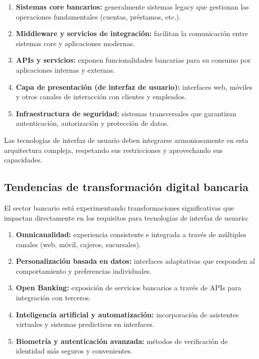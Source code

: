 \begin{enumerate}
  \item \textbf{Sistemas core bancarios:} generalmente sistemas legacy que
        gestionan las operaciones fundamentales (cuentas, préstamos, etc.).
  \item \textbf{Middleware y servicios de integración:} facilitan la
        comunicación entre sistemas core y aplicaciones modernas.
  \item \textbf{APIs y servicios:} exponen funcionalidades bancarias para su
        consumo por aplicaciones internas y externas.
  \item \textbf{Capa de presentación (de interfaz de usuario):} interfaces web, móviles y
        otros canales de interacción con clientes y empleados.
  \item \textbf{Infraestructura de seguridad:} sistemas transversales que
        garantizan autenticación, autorización y protección de datos.
\end{enumerate}

Las tecnologías de interfaz de usuario deben integrarse armoniosamente en esta
arquitectura compleja, respetando sus restricciones y aprovechando sus
capacidades.


\subsection{Tendencias de transformación digital bancaria}


El sector bancario está experimentando transformaciones significativas que
impactan directamente en los requisitos para tecnologías de interfaz de usuario:

\begin{enumerate}
  \item \textbf{Omnicanalidad:} experiencia consistente e integrada a través
        de múltiples canales (web, móvil, cajeros, sucursales).
  \item \textbf{Personalización basada en datos:} interfaces adaptativas que
        responden al comportamiento y preferencias individuales.
  \item \textbf{Open Banking:} exposición de servicios bancarios a través de
        APIs para integración con terceros.
  \item \textbf{Inteligencia artificial y automatización:} incorporación de
        asistentes virtuales y sistemas predictivos en interfaces.
  \item \textbf{Biometría y autenticación avanzada:} métodos de verificación
        de identidad más seguros y convenientes.
\end{enumerate}


